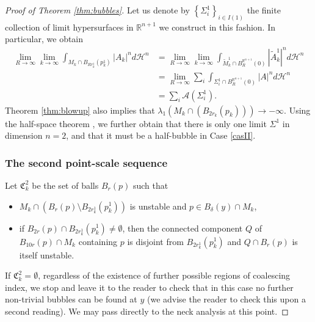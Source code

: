 \documentclass[10pt]{amsart}
\let\mathcal\mathscr
\newcounter{cas}
\theoremstyle{definition}
\newcommand{\R}{\mathbb{R}}
\newcommand{\h}{\mathscr{H}}
\begin{document}
\begin{proof}[Proof of Theorem \ref{thm:bubbles}]
Let us denote by $\left\{\Sigma^1_i\right\}_{i\in I(1)}$ the finite collection of limit hypersurfaces in $\R^{n+1}$ we construct in this fashion. In particular, we obtain
\begin{equation}\label{eq.firstbubble}
\begin{aligned}
\lim_{R\to \infty} \lim_{k\to \infty} \int_{M_k\cap B_{Rr^1_k}(p^1_k)} |A_k|^n d \h^n &= \lim_{R\to \infty} \lim_{k\to \infty} \int_{\widetilde{M}^1_k\cap B^{\R^{n+1}}_{R}(0)} |\widetilde{A}^1_k|^n d \h^n\\
&= \lim_{R\to \infty}\sum_i \int_{\Sigma^1_i \cap B^{\R^{n+1}}_R(0)} |A|^n d \h^n \\
&= \sum_i\mathcal{A}(\Sigma^1_i).
\end{aligned}
\end{equation}
Theorem \ref{thm:blowup} also implies that $\lambda_1(M_k \cap (B_{2r_k}(p_k)))\to -\infty$. Using the half-space theorem \cite{HM90}, we further obtain that there is only one limit $\Sigma^1$ in dimension $n=2$, and that it must be a half-bubble in Case \ref{casII}. 

\subsubsection*{The second point-scale sequence}
Let $\mathfrak{C}^2_k$ be the set of balls $B_r(p)$ such that \begin{itemize}
\item
$M_k\cap (B_r(p)\setminus B_{2r^1_k}(p^1_k))$ is unstable and $p\in B_\delta (y)\cap M_k$,
\item
if $B_{2r}(p)\cap B_{2r^1_k}(p^1_k)\neq\emptyset$, then the connected component $Q$ of $B_{10r}(p)\cap M_k$ containing $p$ is disjoint from $B_{2r^1_k}(p^1_k)$ and $Q\cap B_{r}(p)$ is itself unstable.
\end{itemize}

If $\mathfrak{C}^2_k = \emptyset$, regardless of the existence of further possible regions of coalescing index, we stop and leave it to the reader to check that in this case no further non-trivial bubbles can be found at $y$ (we advise the reader to check this upon a second reading). We may pass directly to the neck analysis at this point.


\end{proof}
\end{document}
